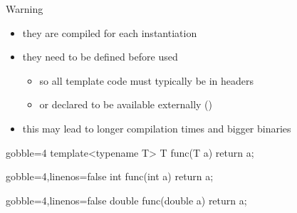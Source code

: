 \begin{frame}[fragile]
  \begin{alertblock}{Warning}
    \begin{itemize}
      \item they are compiled for each instantiation
      \item they need to be defined before used
      \begin{itemize}
        \item so all template code must typically be in headers
        \item or declared to be available externally ()
      \end{itemize}
      \item this may lead to longer compilation times and bigger binaries
    \end{itemize}
  \end{alertblock}
  \newsavebox{\codepiece}
  \begin{lrbox}{\codepiece}
    \begin{minipage}{.35\linewidth}
      \small
      \begin{cppcode*}{gobble=4}
        template<typename T>
        T func(T a) {
          return a;
        }
      \end{cppcode*}
    \end{minipage}
  \end{lrbox}
  \newsavebox{\codepiecea}
  \begin{lrbox}{\codepiecea}
    \begin{minipage}{.4\linewidth}
      \small
      \begin{cppcode*}{gobble=4,linenos=false}
        int func(int a) {
          return a;
        }
      \end{cppcode*}
    \end{minipage}
  \end{lrbox}
  \newsavebox{\codepieceb}
  \begin{lrbox}{\codepieceb}
    \begin{minipage}{.4\linewidth}
      \small
      \begin{cppcode*}{gobble=4,linenos=false}
        double func(double a) {
          return a;
        }
      \end{cppcode*}
    \end{minipage}
  \end{lrbox}
\end{frame}

